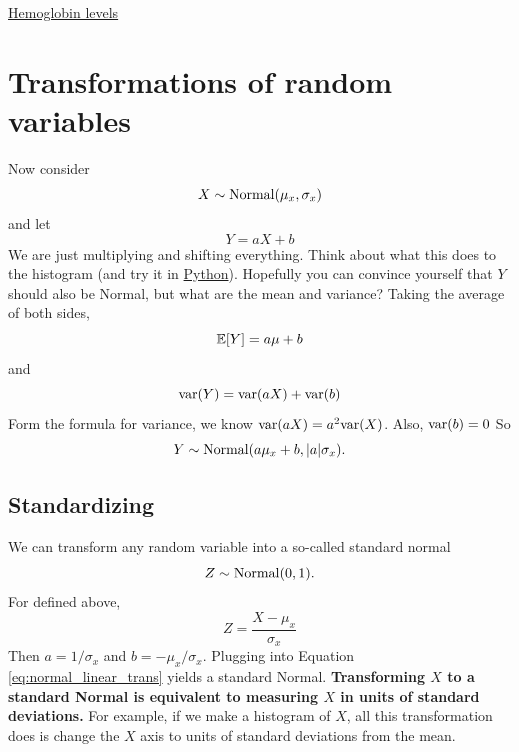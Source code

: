 \begin{exercise}
\href{https://colab.research.google.com/drive/1PPFwE4GUzsr707s3mPhGRs7-TYlHxND2#scrollTo=wq-MSEh7YARC&line=1&uniqifier=1}{Hemoglobin levels}
\end{exercise}

\section{Transformations of random variables}

Now consider 
\begin{equation}
X \sim {\rm Normal}(\mu_x,\sigma_x)
\end{equation}
and let 
\begin{equation}\label{eq:linear}
Y = aX + b
\end{equation}
We are just multiplying and shifting everything.
Think about what this does to the histogram (and try it in \href{https://colab.research.google.com/drive/1PPFwE4GUzsr707s3mPhGRs7-TYlHxND2#scrollTo=qDKKEAeJXm87}{Python}).  Hopefully you can convince yourself that $Y$ should also be Normal, but what are the mean and variance? Taking the average of both sides, 
\begin{equation}
\mathbb E[Y] = a\mu + b
\end{equation}
and 
\begin{equation}
{\rm var}(Y) = {\rm var}(aX) + {\rm var}(b)
\end{equation}
Form the formula for variance, we know ${\rm var}(aX)  = a^2{\rm var}(X)$. Also, ${\rm var}(b) =0$
So 
\begin{equation}\label{eq:normal_linear_trans}
Y \sim {\rm Normal}(a\mu_x + b,|a|\sigma_x).
\end{equation}

\subsection{Standardizing}
We can transform any random variable into a so-called standard normal 
\begin{equation}
Z \sim {\rm Normal}(0,1).
\end{equation}
For defined above, 
\begin{equation}
Z = \frac{X-\mu_x}{\sigma_x}
\end{equation}
Then $a = 1/\sigma_x$ and $b = -\mu_x/\sigma_x$. Plugging into Equation \eqref{eq:normal_linear_trans} yields a standard Normal. {\bf Transforming $X$ to a standard Normal is equivalent to measuring $X$ in units of standard deviations.} For example, if we make a histogram of $X$, all this transformation does is change the $X$ axis to units of standard deviations from the mean.  



